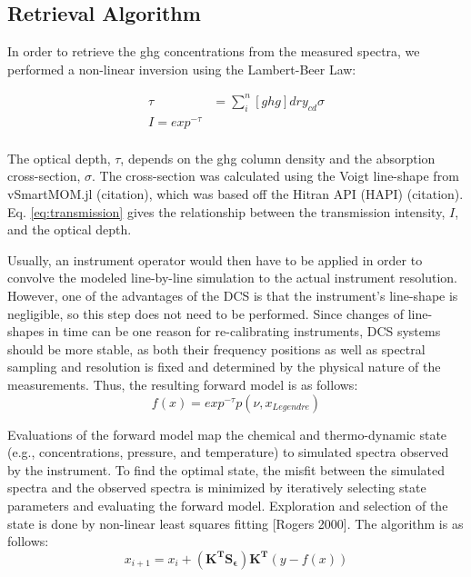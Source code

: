 \documentclass[amt, manuscript]{copernicus}
\begin{document}
\subsection{Retrieval Algorithm }
In order to retrieve the ghg concentrations from the measured spectra, we performed a non-linear inversion using the Lambert-Beer Law:

\begin{align}
  \tau &= \sum_i^n [ghg] dry_{cd} \sigma  \label{eq:optical_depth} \\
  I = exp^{-\tau} \label{eq:transmission} \\
\end{align}

The optical depth, $\tau$, depends on the ghg column density and the absorption cross-section, $\sigma$. The cross-section was calculated using the Voigt line-shape from vSmartMOM.jl (citation), which was based off the Hitran API (HAPI) (citation). Eq. \ref{eq:transmission} gives the relationship between the transmission intensity, $I$, and the optical depth. 

Usually, an instrument operator would then have to be applied in order to convolve the modeled line-by-line simulation to the actual instrument resolution. However, one of the advantages of the DCS is that the instrument's line-shape is negligible, so this step does not need to be performed. Since changes of line-shapes in time can be one reason for re-calibrating instruments, DCS systems should be more stable, as both their frequency positions as well as spectral sampling and resolution is fixed and determined by the physical nature of the measurements. Thus, the resulting forward model is as follows:
\begin{equation}
  f(x) = exp^{-\tau} p(\nu, x_{Legendre})
\end{equation}

Evaluations of the forward model map the chemical and thermo-dynamic state (e.g., concentrations, pressure, and temperature) to simulated spectra observed by the instrument. To find the optimal state, the misfit between the simulated spectra and the observed spectra is minimized by iteratively selecting state parameters and evaluating the forward model. Exploration and selection of the state is done by non-linear least squares fitting [Rogers 2000]. The  algorithm is as follows:
\begin{equation}
  x_{i+1} = x_i + (\mathbf{K^T S_{\epsilon}}) \mathbf{K^T}(y - f(x))
\end{equation}
\end{document}
